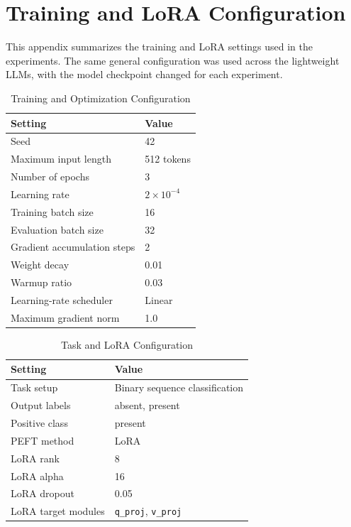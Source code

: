 \appendices
\section{Training and LoRA Configuration}
\label{app:training-config}

This appendix summarizes the training and LoRA settings used in the experiments. The same general configuration was used across the lightweight LLMs, with the model checkpoint changed for each experiment.

\begin{table}[H]
\centering
\caption{Training and Optimization Configuration}
\label{tab:training-config}
\begin{tabular}{ll}
\hline
Setting & Value \\
\hline
Seed & 42 \\
Maximum input length & 512 tokens \\
Number of epochs & 3 \\
Learning rate & $2 \times 10^{-4}$ \\
Training batch size & 16 \\
Evaluation batch size & 32 \\
Gradient accumulation steps & 2 \\
Weight decay & 0.01 \\
Warmup ratio & 0.03 \\
Learning-rate scheduler & Linear \\
Maximum gradient norm & 1.0 \\
\hline
\end{tabular}
\end{table}

\begin{table}[H]
\centering
\caption{Task and LoRA Configuration}
\label{tab:lora-config}
\begin{tabular}{ll}
\hline
Setting & Value \\
\hline
Task setup & Binary sequence classification \\
Output labels & absent, present \\
Positive class & present \\
PEFT method & LoRA \\
LoRA rank & 8 \\
LoRA alpha & 16 \\
LoRA dropout & 0.05 \\
LoRA target modules & \texttt{q\_proj}, \texttt{v\_proj} \\
\hline
\end{tabular}
\end{table}
